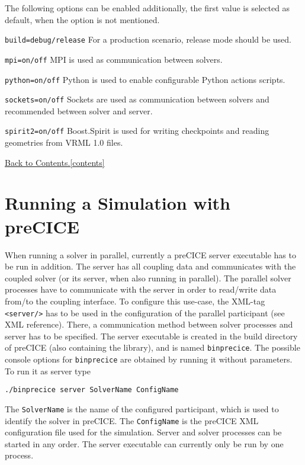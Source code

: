 \documentclass[11pt, oneside]{scrartcl}
\newcommand{\backtocontents}{\hyperref[contents]{Back to Contents.\ref*{contents}}}
\begin{document}
The following options can be enabled additionally, the first value is selected as default, when the option is not mentioned.
\begin{itemize*}
\item \texttt{build=debug/release} For a production scenario, release mode should be used.
\item \texttt{mpi=on/off} MPI is used as communication between solvers.
\item \texttt{python=on/off} Python is used to enable configurable Python actions scripts.
\item \texttt{sockets=on/off} Sockets are used as communication between solvers and recommended between solver and server.
\item \texttt{spirit2=on/off} Boost.Spirit is used for writing checkpoints and reading geometries from VRML 1.0 files.
\end{itemize*}

\backtocontents

\section{Running a Simulation with preCICE}

When running a solver in parallel, currently a preCICE server executable has to be run in addition. The server has all coupling data and communicates with the coupled solver (or its server, when also running in parallel). The parallel solver processes have to communicate with the server in order to read/write data from/to the coupling interface. To configure this use-case, the XML-tag \texttt{<server/>} has to be used in the configuration of the parallel participant (see XML reference). There, a communication method between solver processes and server has to be specified. The server executable is created in the build directory of preCICE (also containing the library), and is named \texttt{binprecice}. The possible console options for \texttt{binprecice} are obtained by running it without parameters. To run it as server type
\begin{verbatim}
./binprecice server SolverName ConfigName
\end{verbatim}
The  \texttt{SolverName} is the name of the configured participant, which is used to identify the solver in preCICE. The \texttt{ConfigName} is the preCICE XML configuration file used for the simulation. Server and solver processes can be started in any order. The server executable can currently only be run by one process.
\end{document}
